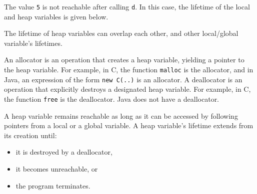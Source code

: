 \documentclass[a4paper, openany]{memoir}
\begin{document}
The value \texttt{5} is not reachable after calling \texttt{d}. In this case, the lifetime of the local and heap variables is given below.
\begin{figure}[H]
    \centering
\end{figure}
\noindent The lifetime of heap variables can overlap each other, and other local/global variable's lifetimes.

An allocator is an operation that creates a heap variable, yielding a pointer to the heap variable. For example, in C, the function \texttt{malloc} is the allocator, and in Java, an expression of the form \texttt{new C(..)} is an allocator. A deallocator is an operation that explicitly destroys a designated heap variable. For example, in C, the function \texttt{free} is the deallocator. Java does not have a deallocator.

A heap variable remains reachable as long as it can be accessed by following pointers from a local or a global variable. A heap variable's lifetime extends from its creation until:
\begin{itemize}
    \item it is destroyed by a deallocator,
    \item it becomes unreachable, or
    \item the program terminates.
\end{itemize}
\end{document}
